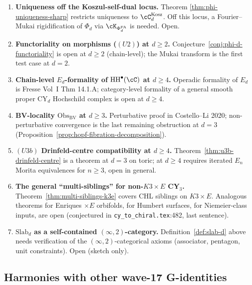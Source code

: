 \documentclass[11pt]{article}
\theoremstyle{definition}
\providecommand{\PhiFA}{\Phi^{\mathrm{FA}}}
\providecommand{\HH}{\mathrm{HH}}
\begin{document}
\begin{enumerate}[leftmargin=*]
\item \textbf{Uniqueness off the Koszul-self-dual locus.} Theorem
\ref{thm:phi-uniqueness-sharp} restricts uniqueness to
$\cC_d^{\mathrm{Kosz}}$.  Off this locus, a Fourier--Mukai
rigidification of $\Phi_d$ via $\cK_{\PhiFA_d}$ is needed. Open.

\item \textbf{Functoriality on morphisms ($(U2)$) at $d \geq 2$.}
Conjecture~\ref{conj:phi-d-functoriality} is open at $d \geq 2$
(chain-level); the Mukai transform is the first test case at $d = 2$.

\item \textbf{Chain-level $E_d$-formality of $\HH^\bullet(\cC)$ at
$d \geq 4$.} Operadic formality of $E_d$ is Fresse Vol~I Thm
14.1.A; category-level formality of a general smooth proper CY$_d$
Hochschild complex is open at $d \geq 4$.

\item \textbf{BV-locality $\mathrm{Obs}_{\mathrm{BV}}$ at $d \geq 3$.}
Perturbative proof in Costello--Li 2020; non-perturbative convergence
is the last remaining obstruction at $d = 3$
(Proposition~\ref{prop:hopf-fibration-decomposition}).

\item \textbf{$(U3b)$ Drinfeld-centre compatibility at $d \geq 4$.}
Theorem~\ref{thm:u3b-drinfeld-centre} is a theorem at $d = 3$ on toric;
at $d \geq 4$ requires iterated $E_n$ Morita equivalences for
$n \geq 3$, open in general.

\item \textbf{The general ``multi-siblings'' for non-$K3 \times E$
CY$_3$.} Theorem~\ref{thm:multi-siblings-k3e} covers CHL siblings on
$K3 \times E$. Analogous theorems for Enriques $\times E$ orbifolds,
for Humbert surfaces, for Niemeier-class inputs, are open (conjectured
in \texttt{cy\_to\_chiral.tex}:482, last sentence).

\item \textbf{$\mathrm{Slab}_d$ as a self-contained $(\infty, 2)$-category.}
Definition~\ref{def:slab-d} above needs verification of the
$(\infty, 2)$-categorical axioms (associator, pentagon, unit constraints).
Open (sketch only).
\end{enumerate}

\subsection*{Harmonies with other wave-17 G-identities}
\end{document}
